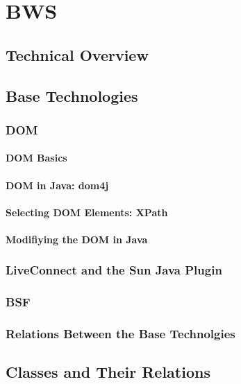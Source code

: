 \section{BWS}
 \subsection{Technical Overview}
 \subsection{Base Technologies}
  \subsubsection{DOM}
  
    
   
   \paragraph{DOM Basics}
   
    
    
   \paragraph{DOM in Java: dom4j}
    
    
    
   \paragraph{Selecting DOM Elements: XPath}
   
    
   
   \paragraph{Modifiying the DOM in Java}
  \subsubsection{LiveConnect and the Sun Java Plugin}
  \subsubsection{BSF}
  \subsubsection{Relations Between the Base Technolgies}
 \subsection{Classes and Their Relations}
